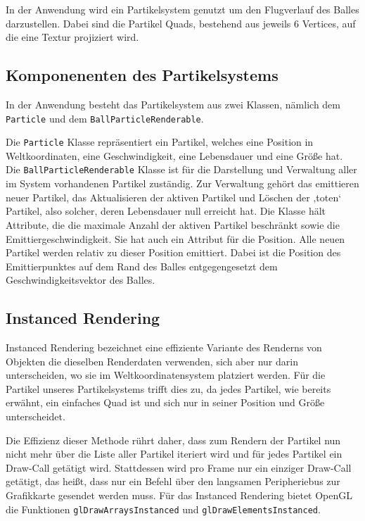 In der Anwendung wird ein Partikelsystem genutzt um den Flugverlauf des Balles darzustellen. Dabei sind die Partikel Quads, bestehend aus jeweils 6 Vertices, auf die eine Textur projiziert wird.

\subsection{Komponenenten des Partikelsystems}
\label{Kapitel_2_-_Unterkapitel_2.1}
%
In der Anwendung besteht das Partikelsystem aus zwei Klassen, nämlich dem {\texttt{Particle}} und dem {\texttt{BallParticleRenderable}}.

Die {\texttt{Particle}} Klasse repräsentiert ein Partikel, welches eine Position in Weltkoordinaten, eine Geschwindigkeit, eine Lebensdauer und eine Größe hat. 
Die {\texttt{BallParticleRenderable}} Klasse ist für die Darstellung und Verwaltung aller im System vorhandenen Partikel zuständig. Zur Verwaltung gehört das emittieren neuer Partikel, das Aktualisieren der aktiven Partikel und Löschen der ‚toten‘ Partikel, also solcher, deren Lebensdauer null erreicht hat. Die Klasse hält Attribute, die die maximale Anzahl der aktiven Partikel beschränkt sowie die Emittiergeschwindigkeit.  Sie hat auch ein Attribut für die Position. Alle neuen Partikel werden relativ zu dieser Position emittiert. Dabei ist die Position des Emittierpunktes auf dem Rand des Balles entgegengesetzt dem Geschwindigkeitsvektor des Balles.

\subsection{Instanced Rendering}
\label{Kapitel_2_-_Unterkapitel_2.2}
%
Instanced Rendering bezeichnet eine effiziente Variante des Renderns von Objekten die dieselben Renderdaten verwenden, sich aber nur darin unterscheiden, wo sie im Weltkoordinatensystem platziert werden. Für die Partikel unseres Partikelsystems trifft dies zu, da jedes Partikel, wie bereits erwähnt, ein einfaches Quad ist und sich nur in seiner Position und Größe unterscheidet.

Die Effizienz dieser Methode rührt daher, dass zum Rendern der Partikel nun nicht mehr über die Liste aller Partikel iteriert wird und für jedes Partikel ein Draw-Call getätigt wird. Stattdessen wird pro Frame nur ein einziger Draw-Call getätigt, das heißt, dass nur ein Befehl über den langsamen Peripheriebus zur Grafikkarte gesendet werden muss. Für das Instanced Rendering bietet OpenGL die Funktionen {\texttt{glDrawArraysInstanced}} und {\texttt{glDrawElementsInstanced}}.

